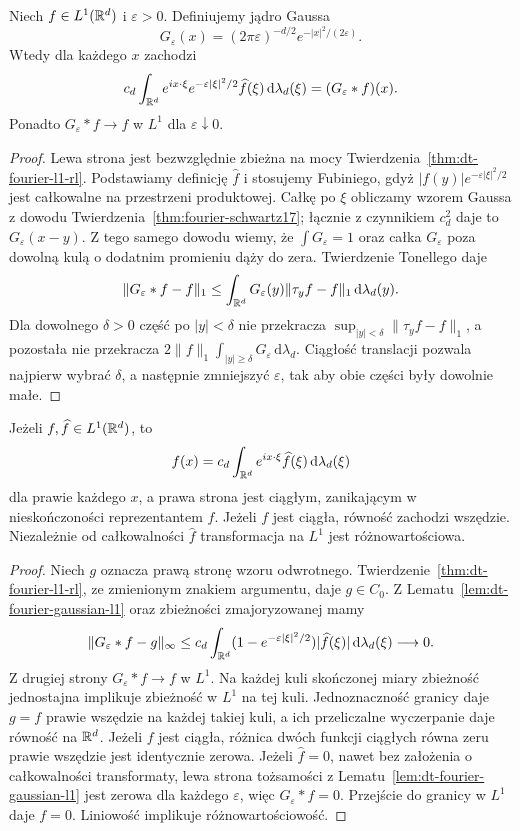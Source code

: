 \begin{lemat}
\label{lem:dt-fourier-gaussian-l1}
Niech $f\in L^1(\mathbb R^d)$ i $\varepsilon>0$.
Definiujemy jądro Gaussa
\[
 G_\varepsilon(x)=(2\pi\varepsilon)^{-d/2}
 e^{-|x|^2/(2\varepsilon)}.
\]
Wtedy dla każdego $x$ zachodzi
\[
 c_d\int_{\mathbb R^d}e^{ix\cdot\xi}
 e^{-\varepsilon|\xi|^2/2}\widehat f(\xi)
 \,\mathrm d\lambda_d(\xi)=(G_\varepsilon*f)(x).
\]
Ponadto $G_\varepsilon*f\to f$ w $L^1$ dla
$\varepsilon\downarrow0$.
\end{lemat}
\begin{proof}
Lewa strona jest bezwzględnie zbieżna na mocy
Twierdzenia~\ref{thm:dt-fourier-l1-rl}.
Podstawiamy definicję $\widehat f$ i stosujemy Fubiniego,
gdyż $|f(y)|e^{-\varepsilon|\xi|^2/2}$ jest całkowalne
na przestrzeni produktowej. Całkę po $\xi$ obliczamy
wzorem Gaussa z dowodu Twierdzenia~\ref{thm:fourier-schwartz17};
łącznie z czynnikiem $c_d^2$ daje to $G_\varepsilon(x-y)$.
Z tego samego dowodu wiemy, że $\int G_\varepsilon=1$
oraz całka $G_\varepsilon$ poza dowolną kulą o dodatnim
promieniu dąży do zera. Twierdzenie Tonellego daje
\[
 \|G_\varepsilon*f-f\|_1
 \le \int_{\mathbb R^d}G_\varepsilon(y)
 \|\tau_yf-f\|_1\,\mathrm d\lambda_d(y).
\]
Dla dowolnego $\delta>0$ część po $|y|<\delta$ nie
przekracza $\sup_{|y|<\delta}\|\tau_yf-f\|_1$,
a pozostała nie przekracza
$2\|f\|_1\int_{|y|\ge\delta}G_\varepsilon\,\mathrm d\lambda_d$.
Ciągłość translacji pozwala najpierw wybrać $\delta$,
a następnie zmniejszyć $\varepsilon$, tak aby obie
części były dowolnie małe.
\end{proof}

\begin{twierdzenie}
\label{thm:dt-fourier-l1-inversion}
Jeżeli $f,\widehat f\in L^1(\mathbb R^d)$, to
\[
 f(x)=c_d\int_{\mathbb R^d}e^{ix\cdot\xi}\widehat f(\xi)
 \,\mathrm d\lambda_d(\xi)
\]
dla prawie każdego $x$, a prawa strona jest ciągłym,
zanikającym w nieskończoności reprezentantem $f$.
Jeżeli $f$ jest ciągła, równość zachodzi wszędzie.
Niezależnie od całkowalności $\widehat f$ transformacja
na $L^1$ jest różnowartościowa.
\end{twierdzenie}
\begin{proof}
Niech $g$ oznacza prawą stronę wzoru odwrotnego.
Twierdzenie~\ref{thm:dt-fourier-l1-rl}, ze zmienionym
znakiem argumentu, daje $g\in C_0$.
Z Lematu~\ref{lem:dt-fourier-gaussian-l1} oraz
zbieżności zmajoryzowanej mamy
\[
 \|G_\varepsilon*f-g\|_\infty
 \le c_d\int_{\mathbb R^d}
 (1-e^{-\varepsilon|\xi|^2/2})|\widehat f(\xi)|
 \,\mathrm d\lambda_d(\xi)\longrightarrow0.
\]
Z drugiej strony $G_\varepsilon*f\to f$ w $L^1$.
Na każdej kuli skończonej miary zbieżność jednostajna
implikuje zbieżność w $L^1$ na tej kuli. Jednoznaczność
granicy daje $g=f$ prawie wszędzie na każdej takiej kuli,
a ich przeliczalne wyczerpanie daje równość na $\mathbb R^d$.
Jeżeli $f$ jest ciągła, różnica dwóch funkcji ciągłych
równa zeru prawie wszędzie jest identycznie zerowa.
Jeżeli $\widehat f=0$, nawet bez założenia o
całkowalności transformaty, lewa strona tożsamości
z Lematu~\ref{lem:dt-fourier-gaussian-l1} jest zerowa
dla każdego $\varepsilon$, więc $G_\varepsilon*f=0$.
Przejście do granicy w $L^1$ daje $f=0$.
Liniowość implikuje różnowartościowość.
\end{proof}

